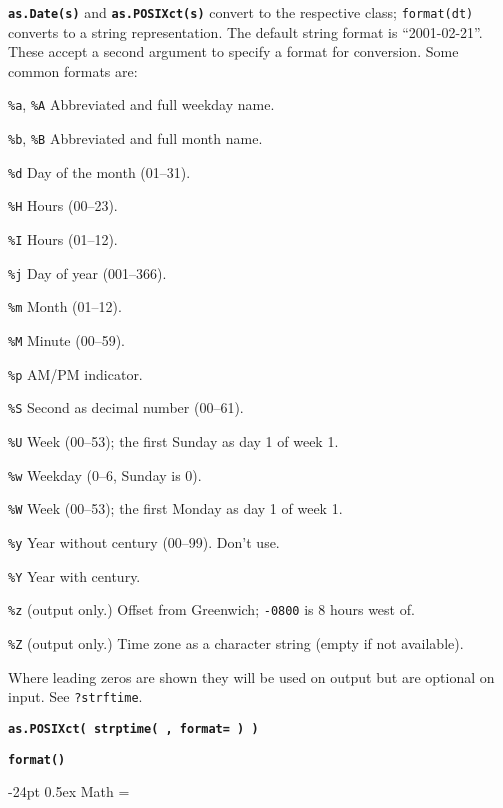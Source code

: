 \documentclass[10pt,landscape]{article}
\makeatletter
\renewcommand\section{\@startsection{section}{1}{0mm}%
                                     {-24pt}%
                                     {0.5ex}%
                                {\color{blue}\normalfont\large\bfseries}}
\newcommand{\code}{\texttt}
\newcommand{\bcode}[1]{\texttt{\textbf{#1}}}
\newcommand{\describe}[1]{\begin{description}{#1}\end{description}}
\makeatother
\begin{document}
\begin{multicols*}{3}
\bcode{as.Date(s)} and \bcode{as.POSIXct(s)} convert to the respective
class; \code{format(dt)} converts to a string representation. The
default string format is ``2001-02-21''. These accept a second argument
to specify a format for conversion. Some common formats are:

  \describe{
\itemsep=0pt\parskip=0pt
    \item{\code{\%a}, \code{\%A}} {Abbreviated and full weekday name.}
    \item{\code{\%b}, \code{\%B}} {Abbreviated and full month name.}
    \item{\code{\%d}} {Day of the month (01--31).}
    \item{\code{\%H}} {Hours (00--23).}
    \item{\code{\%I}} {Hours (01--12).}
    \item{\code{\%j}} {Day of year (001--366).}
    \item{\code{\%m}} {Month (01--12).}
    \item{\code{\%M}} {Minute (00--59).}
    \item{\code{\%p}} {AM/PM indicator. }
    \item{\code{\%S}} {Second as decimal number (00--61).}
    \item{\code{\%U}} {Week (00--53); the first Sunday as day 1 of week 1.}
    \item{\code{\%w}} {Weekday (0--6, Sunday is 0).}
    \item{\code{\%W}} {Week (00--53); the first Monday as day 1 of week 1.}
    \item{\code{\%y}} {Year without century (00--99). Don't use.}
    \item{\code{\%Y}} {Year with century.}
    \item{\code{\%z}} {(output only.) Offset from Greenwich; \code{-0800} is 8 hours west of.}
    \item{\code{\%Z}} {(output only.) Time zone as a character
      string (empty if not available).}
  }

Where leading zeros are shown they will be used on output but are
optional on input. See \code{?strftime}.

\bcode{as.POSIXct( strptime( , format= ) )}

\bcode{format()}

\section{Math}
\everypar={\hangindent=9mm}


\end{multicols*}
\end{document}
